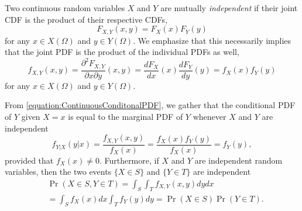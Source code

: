 Two continuous random variables $X$ and $Y$ are mutually \emph{independent} if their joint CDF is the product of their respective CDFs, 
\begin{equation*}
F_{X,Y} (x,y) = F_X (x) F_Y(y)
\end{equation*}
for any $x \in X(\Omega)$ and $y \in Y(\Omega)$.
We emphasize that this necessarily implies that the joint PDF is the product of the individual PDFs as well,
\begin{equation*}
f_{X,Y} (x,y) = \frac{\partial^2 F_{X,Y}}{\partial x \partial y} (x, y)
= \frac{d F_X}{dx} (x) \frac{d F_Y}{dy} (y)
= f_X (x) f_Y (y)
\end{equation*}
for any $x \in X(\Omega)$ and $y \in Y(\Omega)$.

From \eqref{equation:ContinuousConditonalPDF}, we gather that the conditional PDF of $Y$ given $X=x$ is equal to the marginal PDF of $Y$ whenever $X$ and $Y$ are independent
\begin{equation*}
f_{Y|X} (y|x) = \frac{f_{X,Y} (x, y)}{f_X(x)}
= \frac{f_X (x) f_Y (y)}{f_X(x)} = f_Y (y),
\end{equation*}
provided that $f_X(x) \neq 0$.
Furthermore, if $X$ and $Y$ are independent random variables, then the two events $\{ X \in S \}$ and $\{ Y \in T \}$ are independent
\begin{equation*}
\begin{split}
&\Pr (X \in S, Y \in T) = \int_S \int_T f_{X,Y} (x,y) dy dx \\
&= \int_S f_X (x) dx \int_T f_Y (y) dy
= \Pr (X \in S) \Pr (Y \in T).
\end{split}
\end{equation*}

